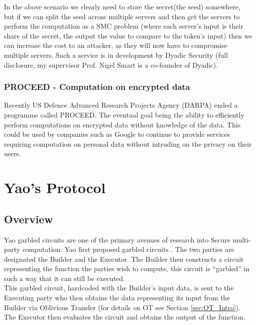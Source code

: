 \documentclass[a4paper,11pt]{article}
\begin{document}
				In the above scenario we clearly need to store the secret(the seed) somewhere, but if we can split the seed across multiple servers and then get the servers to perform the computation as a SMC problem (where each server's input is their share of the secret, the output the value to compare to the token's input) then we can increase the cost to an attacker, as they will now have to compromise multiple servers. Such a service is in development by Dyadic Security (full disclosure, my supervisor Prof. Nigel Smart is a co-founder of Dyadic).

			\subsubsection{PROCEED - Computation on encrypted data} \label{sub2:PROCEED_DARPA}
				Recently US Defence Advanced Research Projects Agency (DARPA) ended a programme called PROCEED. The eventual goal being the ability to efficiently perform computations on encrypted data without knowledge of the data. This could be used by companies such as Google to continue to provide services requiring computation on personal data without intruding on the privacy on their users.


	\section{Yao's Protocol} \label{sec:Yao_Circuits}

		\subsection{Overview} \label{sub:Yao_Overview}
			Yao garbled circuits are one of the primary avenues of research into Secure multi-party computation. Yao first proposed garbled circuits \cite{YaoOriginal}. The two parties are designated the Builder and the Executor. The Builder then constructs a circuit representing the function the parties wish to compute, this circuit is ``garbled'' in such a way that it can still be executed.\\

			This garbled circuit, hardcoded with the Builder's input data, is sent to the Executing party who then obtains the data representing its input from the Builder via Oblivious Transfer (for details on OT see Section  \ref{sec:OT_Intro}). The Executor then evaluates the circuit and obtains the output of the function.
\end{document}
